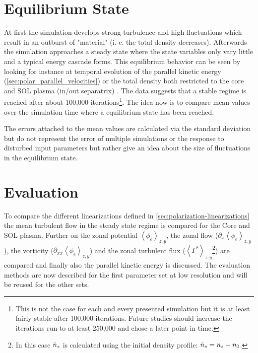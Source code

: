 \documentclass[master.tex]{subfiles}
\newcommand{\meanxy}[1]{\left<#1\right>_{z,y}}
\begin{document}
\section{Equilibrium State}
At first the simulation develops strong turbulence and high fluctuations which result in an outburst of "material" (i. e. the total density decreases). Afterwards the simulation approaches a steady state where the state variables only vary little and a typical energy cascade forms. This equilibrium behavior can be seen by looking for instance at temporal evolution of the parallel kinetic energy (\autoref{sec:polar_parallel_velocities}) or the total density both restricted to the core and \ac{SOL} plasma (in/out separatrix) . The data suggests that a stable regime is reached after about 100,000 iterations\footnote{This is not the case for each and every presented simulation but it is at least fairly stable after 100,000 iterations. Future studies should increase the iterations run to at least 250,000 and chose a later point in time.}. The idea now is to compare mean values over the simulation time where a equilibrium state has been reached. 



\begin{blockquote}
    The errors attached to the mean values are calculated via the standard deviation but do not represent the error of multiple simulations or the response to disturbed input parameters but rather give an idea about the size of fluctuations in the equilibrium state.
\end{blockquote}
    
\section{Evaluation}
To compare the different linearizations defined in \autoref{sec:polarization-linearizations} the mean turbulent flow in the steady state regime is compared for the Core and \ac{SOL} plasma. Further on the zonal potential  $\meanxy{\phi_e}$, the zonal flow ($\partial_x \meanxy{\phi_e}$), the vorticity ($\partial_{xx}\meanxy{\phi_e}$) and the zonal turbulent flux ($\left<\Gamma^*\right>_{z,y}$\footnote{In this case $\Tilde{n}_s$ is calculated using the initial density profile: $\Tilde{n}_s = n_s - n_0$.}) are compared and finally also the parallel kinetic energy is discussed. The evaluation methods are now described for the first parameter set at low resolution and will be reused for the other sets.
\end{document}
